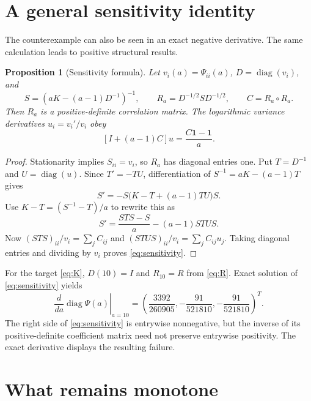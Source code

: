 \documentclass[11pt]{article}
\newtheorem{proposition}[theorem]{Proposition}
\theoremstyle{remark}\newtheorem{remark}[theorem]{Remark}
\DeclareMathOperator{\diag}{diag}
\newcommand{\one}{\mathbf 1}
\begin{document}
\section{A general sensitivity identity}
The counterexample can also be seen in an exact negative derivative. The same calculation leads to positive structural results.

\begin{proposition}[Sensitivity formula]\label{prop:sensitivity}
Let $v_i(a)=\Psi_{ii}(a)$, $D=\diag(v_i)$, and
\[
S=(aK-(a-1)D^{-1})^{-1},\qquad
R_a=D^{-1/2}SD^{-1/2},\qquad C=R_a\circ R_a.
\]
Then $R_a$ is a positive-definite correlation matrix. The logarithmic variance derivatives $u_i=v_i'/v_i$ obey
\begin{equation}\label{eq:sensitivity}
\boxed{[I+(a-1)C]u=\frac{C\one-\one}{a}.}
\end{equation}
\end{proposition}
\begin{proof}
Stationarity implies $S_{ii}=v_i$, so $R_a$ has diagonal entries one. Put $T=D^{-1}$ and $U=\diag(u)$. Since $T'=-TU$, differentiation of $S^{-1}=aK-(a-1)T$ gives
\[
S'=-S\bigl(K-T+(a-1)TU\bigr)S.
\]
Use $K-T=(S^{-1}-T)/a$ to rewrite this as
\[
S'=\frac{STS-S}{a}-(a-1)STUS.
\]
Now $(STS)_{ii}/v_i=\sum_j C_{ij}$ and $(STUS)_{ii}/v_i=\sum_j C_{ij}u_j$. Taking diagonal entries and dividing by $v_i$ proves \eqref{eq:sensitivity}.
\end{proof}
For the target \eqref{eq:K}, $D(10)=I$ and $R_{10}=R$ from \eqref{eq:R}. Exact solution of \eqref{eq:sensitivity} yields
\begin{equation}\label{eq:derivative}
\left.\frac{d}{da}\diag\Psi(a)\right|_{a=10}
=\left(\frac{3392}{260905},-\frac{91}{521810},-\frac{91}{521810}\right)^T.
\end{equation}
The right side of \eqref{eq:sensitivity} is entrywise nonnegative, but the inverse of its positive-definite coefficient matrix need not preserve entrywise positivity. The exact derivative displays the resulting failure.

\section{What remains monotone}
\end{document}
